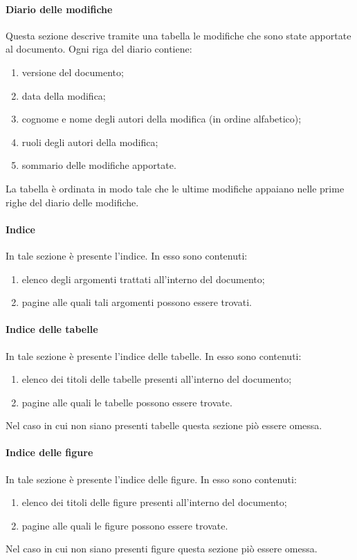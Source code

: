 			\paragraph{Diario delle modifiche}
				Questa sezione descrive tramite una tabella le modifiche che sono state apportate al documento. Ogni riga del diario contiene:
				\begin{enumerate}
					\item versione del documento;
					\item data della modifica;
					\item cognome e nome degli autori della modifica (in ordine alfabetico);
					\item ruoli degli autori della modifica;
					\item sommario delle modifiche apportate.
				\end{enumerate}
				La tabella è ordinata in modo tale che le ultime modifiche appaiano nelle prime righe del diario delle modifiche.
			\paragraph{Indice}
				In tale sezione è presente l’indice. In esso sono contenuti:
				\begin{enumerate}
					\item elenco degli argomenti trattati all’interno del documento;
					\item pagine alle quali tali argomenti possono essere trovati.
				\end{enumerate}
			\paragraph{Indice delle tabelle}
				In tale sezione è presente l’indice delle tabelle. In esso sono contenuti:
				\begin{enumerate}
					\item elenco dei titoli delle tabelle presenti all’interno del documento;
					\item pagine alle quali le tabelle possono essere trovate.
				\end{enumerate}
				Nel caso in cui non siano presenti tabelle questa sezione piò essere omessa.
			\paragraph{Indice delle figure}
				In tale sezione è presente l’indice delle figure. In esso sono contenuti:
				\begin{enumerate}
					\item elenco dei titoli delle figure presenti all’interno del documento;
					\item pagine alle quali le figure possono essere trovate.
				\end{enumerate}
				Nel caso in cui non siano presenti figure questa sezione piò essere omessa.
